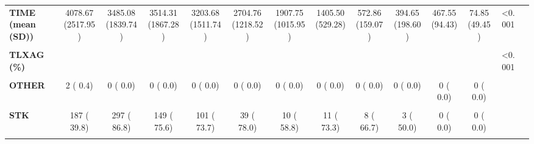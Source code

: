\documentclass[
]{article}
\begin{document}
\begin{table}[H]
\begin{tabular}[t]{>{\raggedright\arraybackslash}p{5em}ccccccccccccc}
\textbf{TIME (mean (SD))} & 4078.67 (2517.95) & 3485.08 (1839.74) & 3514.31 (1867.28) & 3203.68 (1511.74) & 2704.76 (1218.52) & 1907.75 (1015.95) & 1405.50 (529.28) & 572.86 (159.07) & 394.65 (198.60) & 467.55 (94.43) & 74.85 (49.45) & <0.001 & \\
\textbf{\cellcolor{gray!10}{TLX = YES (\%)}} & \cellcolor{gray!10}{470 ( 79.5)} & \cellcolor{gray!10}{336 ( 54.9)} & \cellcolor{gray!10}{206 ( 30.0)} & \cellcolor{gray!10}{137 ( 23.0)} & \cellcolor{gray!10}{50 (  9.9)} & \cellcolor{gray!10}{17 (  3.0)} & \cellcolor{gray!10}{15 (  2.5)} & \cellcolor{gray!10}{15 (  2.5)} & \cellcolor{gray!10}{6 (  0.3)} & \cellcolor{gray!10}{4 (  0.2)} & \cellcolor{gray!10}{6 (  0.3)} & \cellcolor{gray!10}{<0.001} & \cellcolor{gray!10}{}\\
\textbf{TLXAG (\%)} &  &  &  &  &  &  &  &  &  &  &  & <0.001 & \\
\textbf{\cellcolor{gray!10}{Alteplase (tPA)}} & \cellcolor{gray!10}{0 (  0.0)} & \cellcolor{gray!10}{0 (  0.0)} & \cellcolor{gray!10}{0 (  0.0)} & \cellcolor{gray!10}{0 (  0.0)} & \cellcolor{gray!10}{0 (  0.0)} & \cellcolor{gray!10}{0 (  0.0)} & \cellcolor{gray!10}{0 (  0.0)} & \cellcolor{gray!10}{0 (  0.0)} & \cellcolor{gray!10}{0 (  0.0)} & \cellcolor{gray!10}{0 (  0.0)} & \cellcolor{gray!10}{6 (100.0)} & \cellcolor{gray!10}{} & \cellcolor{gray!10}{}\\
\textbf{OTHER} & 2 (  0.4) & 0 (  0.0) & 0 (  0.0) & 0 (  0.0) & 0 (  0.0) & 0 (  0.0) & 0 (  0.0) & 0 (  0.0) & 0 (  0.0) & 0 (  0.0) & 0 (  0.0) &  & \\
\textbf{\cellcolor{gray!10}{RPA}} & \cellcolor{gray!10}{242 ( 51.5)} & \cellcolor{gray!10}{0 (  0.0)} & \cellcolor{gray!10}{0 (  0.0)} & \cellcolor{gray!10}{0 (  0.0)} & \cellcolor{gray!10}{0 (  0.0)} & \cellcolor{gray!10}{0 (  0.0)} & \cellcolor{gray!10}{0 (  0.0)} & \cellcolor{gray!10}{0 (  0.0)} & \cellcolor{gray!10}{0 (  0.0)} & \cellcolor{gray!10}{0 (  0.0)} & \cellcolor{gray!10}{0 (  0.0)} & \cellcolor{gray!10}{} & \cellcolor{gray!10}{}\\
\textbf{STK} & 187 ( 39.8) & 297 ( 86.8) & 149 ( 75.6) & 101 ( 73.7) & 39 ( 78.0) & 10 ( 58.8) & 11 ( 73.3) & 8 ( 66.7) & 3 ( 50.0) & 0 (  0.0) & 0 (  0.0) &  & \\
\textbf{\cellcolor{gray!10}{tPA}} & \cellcolor{gray!10}{39 (  8.3)} & \cellcolor{gray!10}{45 ( 13.2)} & \cellcolor{gray!10}{48 ( 24.4)} & \cellcolor{gray!10}{36 ( 26.3)} & \cellcolor{gray!10}{11 ( 22.0)} & \cellcolor{gray!10}{7 ( 41.2)} & \cellcolor{gray!10}{4 ( 26.7)} & \cellcolor{gray!10}{4 ( 33.3)} & \cellcolor{gray!10}{3 ( 50.0)} & \cellcolor{gray!10}{4 (100.0)} & \cellcolor{gray!10}{0 (  0.0)} & \cellcolor{gray!10}{} & \cellcolor{gray!10}{}\\

\end{tabular}
\end{table}
\end{document}
